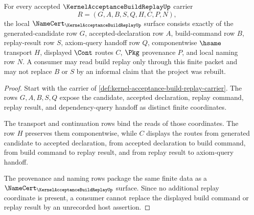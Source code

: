 \begin{theorem}
\label{thm:kernel-acceptance-build-replay-namecert-obligations}
For every accepted $\KernelAcceptanceBuildReplayUp$ carrier
$$
R=(G,A,B,S,Q,H,C,P,N),
$$
the local $\NameCert_{\KernelAcceptanceBuildReplayUp}$ surface consists exactly of the generated-candidate row $G$, accepted-declaration row $A$, build-command row $B$, replay-result row $S$, axiom-query handoff row $Q$, componentwise $\hsame$ transport $H$, displayed $\Cont$ routes $C$, $\Pkg$ provenance $P$, and local naming row $N$. A consumer may read build replay only through this finite packet and may not replace $B$ or $S$ by an informal claim that the project was rebuilt.
\end{theorem}
\begin{proof}
Start with the carrier of \autoref{def:kernel-acceptance-build-replay-carrier}. The rows $G,A,B,S,Q$ expose the candidate, accepted declaration, replay command, replay result, and dependency-query handoff as distinct finite coordinates.

The transport and continuation rows bind the reads of those coordinates. The row $H$ preserves them componentwise, while $C$ displays the routes from generated candidate to accepted declaration, from accepted declaration to build command, from build command to replay result, and from replay result to axiom-query handoff.

The provenance and naming rows package the same finite data as a $\NameCert_{\KernelAcceptanceBuildReplayUp}$ surface. Since no additional replay coordinate is present, a consumer cannot replace the displayed build command or replay result by an unrecorded host assertion.
\end{proof}


